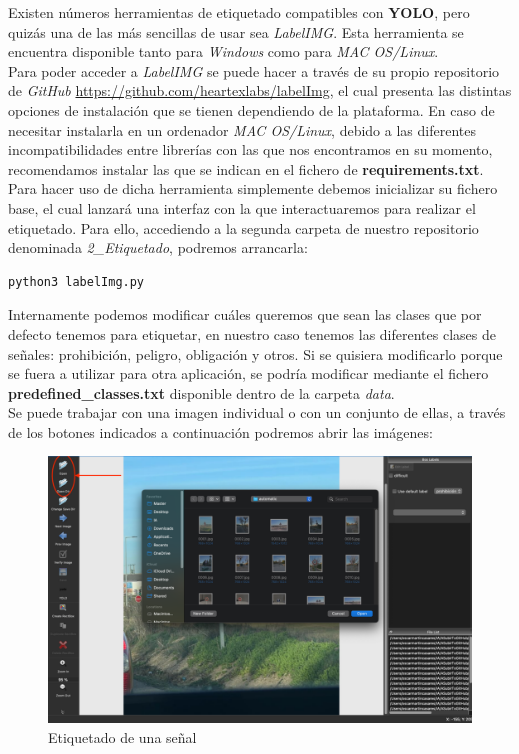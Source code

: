 Existen números herramientas de etiquetado compatibles con \textbf{YOLO}, pero quizás una de las más sencillas de usar sea \textit{LabelIMG}. Esta herramienta se encuentra disponible tanto para \textit{Windows} como para \textit{MAC OS/Linux}.\\

Para poder acceder a \textit{LabelIMG} se puede hacer a través de su propio repositorio de \textit{GitHub} \url{https://github.com/heartexlabs/labelImg}, el cual presenta las distintas opciones de instalación que se tienen dependiendo de la plataforma. En caso de necesitar instalarla en un ordenador \textit{MAC OS/Linux}, debido a las diferentes incompatibilidades entre librerías con las que nos encontramos en su momento, recomendamos instalar las que se indican en el fichero de \textbf{requirements.txt}. \\

Para hacer uso de dicha herramienta simplemente debemos inicializar su fichero base, el cual lanzará una interfaz con la que interactuaremos para realizar el etiquetado. Para ello, accediendo a la segunda carpeta de nuestro repositorio denominada \textit{2_Etiquetado}, podremos arrancarla:

\begin{lstlisting}
python3 labelImg.py
\end{lstlisting}

Internamente podemos modificar cuáles queremos que sean las clases que por defecto tenemos para etiquetar, en nuestro caso tenemos las diferentes clases de señales: prohibición, peligro, obligación y otros. Si se quisiera modificarlo porque se fuera a utilizar para otra aplicación, se podría modificar mediante el fichero \textbf{predefined_classes.txt} disponible dentro de la carpeta \textit{data}.\\

Se puede trabajar con una imagen individual o con un conjunto de ellas, a través de los botones indicados a continuación podremos abrir las imágenes:

\begin{figure}[H]
	\centering
	\includegraphics[width=\textwidth]{Imagenes/AnexoI_Manual/AA/etiquetado1.pdf}
	\caption{Etiquetado de una señal}
	\label{etique1}
\end{figure}

